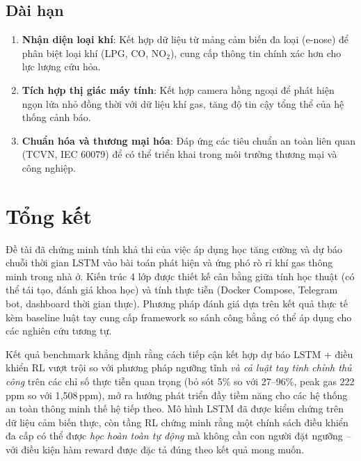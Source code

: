 \subsection{Dài hạn}

\begin{enumerate}
  \item \textbf{Nhận diện loại khí}: Kết hợp dữ liệu từ mảng cảm biến đa loại (e-nose) để phân biệt loại khí (LPG, CO, NO$_2$), cung cấp thông tin chính xác hơn cho lực lượng cứu hỏa.

  \item \textbf{Tích hợp thị giác máy tính}: Kết hợp camera hồng ngoại để phát hiện ngọn lửa nhỏ đồng thời với dữ liệu khí gas, tăng độ tin cậy tổng thể của hệ thống cảnh báo.

  \item \textbf{Chuẩn hóa và thương mại hóa}: Đáp ứng các tiêu chuẩn an toàn liên quan (TCVN, IEC 60079) để có thể triển khai trong môi trường thương mại và công nghiệp.
\end{enumerate}

\section{Tổng kết}

Đề tài đã chứng minh tính khả thi của việc áp dụng học tăng cường và dự báo chuỗi thời gian LSTM vào bài toán phát hiện và ứng phó rò rỉ khí gas thông minh trong nhà ở. Kiến trúc 4 lớp được thiết kế cân bằng giữa tính học thuật (có thể tái tạo, đánh giá khoa học) và tính thực tiễn (Docker Compose, Telegram bot, dashboard thời gian thực). Phương pháp đánh giá dựa trên kết quả thực tế kèm baseline luật tay cung cấp framework so sánh công bằng có thể áp dụng cho các nghiên cứu tương tự.

Kết quả benchmark khẳng định rằng cách tiếp cận kết hợp dự báo LSTM + điều khiển RL vượt trội so với phương pháp ngưỡng tĩnh \emph{và cả luật tay tinh chỉnh thủ công} trên các chỉ số thực tiễn quan trọng (bỏ sót 5\% so với 27--96\%, peak gas 222\,ppm so với 1{,}508\,ppm), mở ra hướng phát triển đầy tiềm năng cho các hệ thống an toàn thông minh thế hệ tiếp theo. Mô hình LSTM đã được kiểm chứng trên dữ liệu cảm biến thực, còn tầng RL chứng minh rằng một chính sách điều khiển đa cấp có thể được \emph{học hoàn toàn tự động} mà không cần con người đặt ngưỡng -- với điều kiện hàm reward được đặc tả đúng theo kết quả mong muốn.
